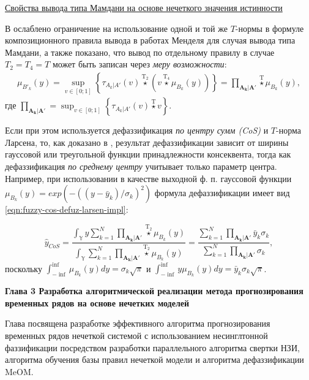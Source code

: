 \ul{Свойства вывода типа Мамдани на основе нечеткого значения истинности}

В \cite{Sinuk2023} ослаблено ограничение на использование одной и той же $T$-нормы в формуле композиционного правила вывода в работах Менделя для случая вывода типа Мамдани, а также показано, что вывод по отдельному правилу в случае $T_2 = T_4 = T$ может быть записан через \textit{меру возможности}:
\begin{align}
	\mu_{B'_k}(y) = \sup_{v\in[0;1]}\left\{\tau_{A_{k}|A'}(v) \overset{\mathrm{T_2}}{\star} (v \overset{\mathrm{T_4}}{\star} \mu_{B_k}(y)) \right\} = \textstyle\prod_{\mathbf{A_k}|\mathbf{A'}} \overset{\mathrm{T}}{\star} \mu_{B_k}(y),
\end{align}
где $\prod_{\mathbf{A_k}|\mathbf{A'}}=\sup_{v\in[0;1]}\left\{\tau_{A_{k}|A'}(v) \overset{\mathrm{T}}{\star} v\right\}$.

Если при этом используется дефаззификация \textit{по центру сумм (CoS)} и $T$-норма Ларсена, то, как доказано в \cite{Sinuk2023}, результат дефаззификации зависит от ширины гауссовой или треугольной функции принадлежности консеквента, тогда как дефаззификация \textit{по среднему центру} учитывает только параметр центра. Например, при использовании в качестве выходной ф. п. гауссовой функции $\mu_{B_k}(y) = exp(-((y-\bar{y}_k)/\sigma_k)^2)$ формула дефаззификации имеет вид \eqref{eqn:fuzzy-cos-defuz-larsen-impl}: 

\begin{equation}
	\label{eqn:fuzzy-cos-defuz-larsen-impl}
	\hat{y}_{CoS} = \frac{\int_{\mathbb{Y}} y \sum_{k=1}^{N} \prod_{\mathbf{A_k}|\mathbf{A'}} \overset{\mathrm{T}_2}{\star} \mu_{B_k}(y)}{\int_{\mathbb{Y}} \sum_{k=1}^{N} \prod_{\mathbf{A_k}|\mathbf{A'}} \overset{\mathrm{T}_2}{\star} \mu_{B_k}(y)} = \frac{\sum_{k=1}^{N} \prod_{\mathbf{A_k}|\mathbf{A'}} \bar{y}_k \sigma_k}{\sum_{k=1}^{N} \prod_{\mathbf{A_k}|\mathbf{A'}} \sigma_k},
\end{equation}
поскольку $	\int_{-\inf}^{\inf}\mu_{B_k}(y) dy = \sigma_k \sqrt{\pi}$ и $\int_{-\inf}^{\inf} y \mu_{B_k}(y) dy = \bar{y}_k \sigma_k \sqrt{\pi}$.


\textbf{Глава 3 Разработка алгоритмической реализации метода прогнозирования временных рядов на основе нечетких моделей}

Глава посвящена разработке эффективного алгоритма прогнозирования временных рядов нечеткой системой с использованием несинглтонной фаззификации посредством разработки параллельного алгоритма свертки НЗИ, алгоритма обучения базы правил нечеткой модели и алгоритма дефаззификации MeOM.


